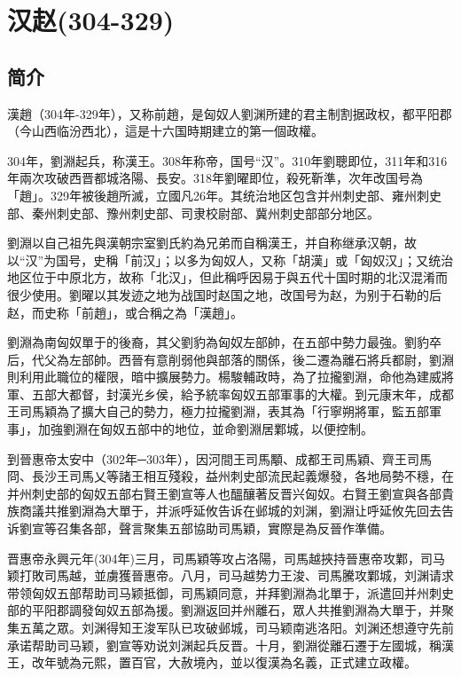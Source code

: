

\section{汉赵\tiny(304-329)}

\subsection{简介}

漢趙（304年-329年），又称前趙，是匈奴人劉渊所建的君主制割据政权，都平阳郡（今山西临汾西北），這是十六国時期建立的第一個政權。

304年，劉淵起兵，称漢王。308年称帝，国号“汉”。310年劉聰即位，311年和316年兩次攻破西晋都城洛陽、長安。318年劉曜即位，殺死靳準，次年改国号為「趙」。329年被後趙所滅，立國凡26年。其统治地区包含并州刺史部、雍州刺史部、秦州刺史部、豫州刺史部、司隶校尉部、冀州刺史部部分地区。

劉淵以自己祖先與漢朝宗室劉氏約為兄弟而自稱漢王，并自称继承汉朝，故以“汉”为国号，史稱「前汉」；以多为匈奴人，又称「胡漢」或「匈奴汉」；又统治地区位于中原北方，故称「北汉」，但此稱呼因易于與五代十国时期的北汉混淆而很少使用。劉曜以其发迹之地为战国时赵国之地，改国号为赵，为别于石勒的后赵，而史称「前趙」，或合稱之為「漢趙」。

劉淵為南匈奴單于的後裔，其父劉豹為匈奴左部帥，在五部中勢力最強。劉豹卒后，代父為左部帥。西晉有意削弱他與部落的關係，後二遷為離石將兵都尉，劉淵則利用此職位的權限，暗中擴展勢力。楊駿輔政時，為了拉攏劉淵，命他為建威將軍、五部大都督，封漢光乡侯，給予統率匈奴五部軍事的大權。到元康末年，成都王司馬穎為了擴大自己的勢力，極力拉攏劉淵，表其為「行寧朔將軍，監五部軍事」，加強劉淵在匈奴五部中的地位，並命劉淵居鄴城，以便控制。

到晉惠帝太安中（302年─303年），因河間王司馬顒、成都王司馬穎、齊王司馬冏、長沙王司馬乂等諸王相互殘殺，益州刺史部流民起義爆發，各地局勢不穩，在并州刺史部的匈奴五部右賢王劉宣等人也醞釀著反晋兴匈奴。右賢王劉宣與各部貴族商議共推劉淵為大單于，并派呼延攸告诉在邺城的刘渊，劉淵让呼延攸先回去告诉劉宣等召集各部，聲言聚集五部協助司馬穎，實際是為反晉作準備。

晋惠帝永興元年(304年)三月，司馬穎等攻占洛陽，司馬越挾持晉惠帝攻鄴，司马颖打敗司馬越，並虜獲晉惠帝。八月，司马越势力王浚、司馬騰攻鄴城，刘渊请求带领匈奴五部帮助司马颖抵御，司馬穎同意，并拜劉淵為北單于，派遣回并州刺史部的平阳郡調發匈奴五部為援。劉淵返回并州離石，眾人共推劉淵為大單于，并聚集五萬之眾。刘渊得知王浚军队已攻破邺城，司马颖南逃洛阳。刘渊还想遵守先前承诺帮助司马颖，劉宣等劝说刘渊起兵反晋。十月，劉淵從離石遷于左國城，稱漢王，改年號為元熙，置百官，大赦境內，並以復漢為名義，正式建立政權。

